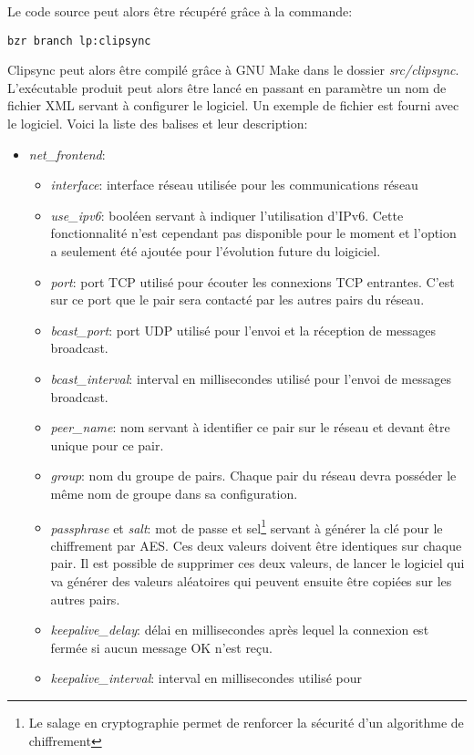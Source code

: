 Le code source peut alors être récupéré grâce à la commande:
\begin{verbatim}
bzr branch lp:clipsync
\end{verbatim}
Clipsync peut alors être compilé grâce à GNU Make dans le dossier
\emph{src/clipsync}.
L'exécutable produit peut alors être lancé en passant en paramètre un nom
de fichier XML servant à configurer le logiciel. Un exemple de fichier
est fourni avec le logiciel. Voici la liste des balises et leur description:
\begin{itemize}
\item \emph{net\_frontend}:
  \begin{itemize}
  \item \emph{interface}: interface réseau utilisée pour les communications
    réseau
  \item \emph{use\_ipv6}: booléen servant à indiquer l'utilisation d'IPv6.
    Cette fonctionnalité n'est cependant pas disponible pour le moment et
    l'option a seulement été ajoutée pour l'évolution future du loigiciel.
  \item \emph{port}: port TCP utilisé pour écouter les connexions TCP
    entrantes. C'est sur ce port que le pair sera contacté par les autres
    pairs du réseau.
  \item \emph{bcast\_port}: port UDP utilisé pour l'envoi et la réception de
    messages broadcast.
  \item \emph{bcast\_interval}: interval en millisecondes utilisé pour l'envoi
    de messages broadcast.
  \item \emph{peer\_name}: nom servant à identifier ce pair sur le réseau et
    devant être unique pour ce pair.
  \item \emph{group}: nom du groupe de pairs. Chaque pair du réseau devra
    posséder le même nom de groupe dans sa configuration.
  \item \emph{passphrase} et \emph{salt}: mot de passe et sel\footnote{Le
      salage en cryptographie permet de renforcer la sécurité d'un algorithme
      de chiffrement\cite{wiki:salage}} servant à générer la clé pour le
    chiffrement par AES. Ces deux valeurs doivent être identiques sur chaque
    pair. Il est possible de supprimer ces deux valeurs, de lancer le
    logiciel qui va générer des valeurs aléatoires qui peuvent ensuite
    être copiées sur les autres pairs.
  \item \emph{keepalive\_delay}: délai en millisecondes après lequel la
    connexion est fermée si aucun message OK n'est reçu.
  \item \emph{keepalive\_interval}: interval en millisecondes utilisé pour

\end{itemize}
\end{itemize}
